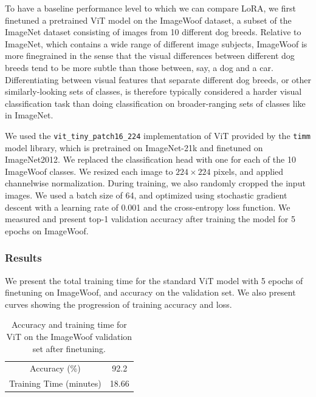 \documentclass[10pt]{article}
\begin{document}
To have a baseline performance level to which we can compare LoRA, we first finetuned a pretrained ViT \cite{dosovitskiy2021imageworth16x16words} model on the ImageWoof dataset, a subset of the ImageNet \cite{deng2009imagenet} dataset consisting of images from 10 different dog breeds. Relative to ImageNet, which contains a wide range of different image subjects, ImageWoof is more finegrained in the sense that the visual differences between different dog breeds tend to be more subtle than those between, say, a dog and a car. Differentiating between visual features that separate different dog breeds, or other similarly-looking sets of classes, is therefore typically considered a harder visual classification task than doing classification on broader-ranging sets of classes like in ImageNet.

We used the \verb|vit_tiny_patch16_224| implementation of ViT provided by the \verb|timm| \cite{rw2019timm} model library, which is pretrained on ImageNet-21k and finetuned on ImageNet2012. We replaced the classification head with one for each of the 10 ImageWoof classes. We resized each image to $224 \times 224$ pixels, and applied channelwise normalization. During training, we also randomly cropped the input images. We used a batch size of 64, and optimized using stochastic gradient descent with a learning rate of 0.001 and the cross-entropy loss function. We measured and present top-1 validation accuracy after training the model for 5 epochs on ImageWoof.

\subsubsection{Results}

We present the total training time for the standard ViT model with 5 epochs of finetuning on ImageWoof, and accuracy on the validation set. We also present curves showing the progression of training accuracy and loss.

\begin{table}[ht]
    \centering
    \begin{tabular}{c|c}
        Accuracy (\%) &  92.2 \\
        Training Time (minutes) & 18.66
    \end{tabular}
    \caption{Accuracy and training time for ViT on the ImageWoof validation set after finetuning.}
    \label{tab:placeholder}
\end{table}
\end{document}
